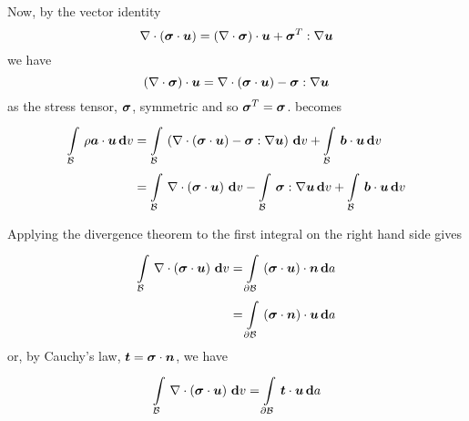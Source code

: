Now, by the vector identity
\begin{equation}
  \divergence{}{\pbrac{\dotprod{\tensortwo{\sigma}}{\vectr{u}}}}=\dotprod{\pbrac{\divergence{}{\tensortwo{\sigma}}}}{\vectr{u}}+
  \doubledotprod{\transpose{\tensortwo{\sigma}}}{\gradient{}{\vectr{u}}}
\end{equation}
we have
\begin{equation}
  \dotprod{\pbrac{\divergence{}{\tensortwo{\sigma}}}}{\vectr{u}}=\divergence{}{\pbrac{\dotprod{\tensortwo{\sigma}}{\vectr{u}}}}-
  \doubledotprod{\tensortwo{\sigma}}{\gradient{}{\vectr{u}}}
\end{equation}
as the stress tensor, $\boldsymbol{\mathit{\sigma}}$, symmetric and so
${\boldsymbol{\mathit{\sigma}}}^{T}=\boldsymbol{\mathit{\sigma}}$.  becomes
\begin{equation}
  \begin{split}
    \gint{\embedmanifold{B}}{}{\dotprod{\rho\vectr{a}}{\vectr{u}}}{v}&=
    \gint{\embedmanifold{B}}{}{\pbrac{\divergence{}{\pbrac{\dotprod{\tensor{\sigma}}{\vectr{u}}}}-
        \doubledotprod{\tensor{\sigma}}{\gradient{}{\vectr{u}}}}}{v}+
    \gint{\embedmanifold{B}}{}{\dotprod{\vectr{b}}{\vectr{u}}}{v} \\
    &=\gint{\embedmanifold{B}}{}{\divergence{}{\pbrac{\dotprod{\tensor{\sigma}}{\vectr{u}}}}}{v}-
    \gint{\embedmanifold{B}}{}{\doubledotprod{\tensor{\sigma}}{\gradient{}{\vectr{u}}}}{v}+
    \gint{\embedmanifold{B}}{}{\dotprod{\vectr{b}}{\vectr{u}}}{v}
  \end{split}
\end{equation}

Applying the divergence theorem to the first integral on the right hand side
gives
\begin{equation}
  \begin{split}
    \gint{\embedmanifold{B}}{}{\divergence{}{\pbrac{\dotprod{\tensor{\sigma}}{\vectr{u}}}}}{v}
    &=\gint{\boundary{\embedmanifold{B}}}{}{\dotprod{\pbrac{\dotprod{\tensor{\sigma}}{\vectr{u}}}}{\vectr{n}}}{a}\\
    &=\gint{\boundary{\embedmanifold{B}}}{}{\dotprod{\pbrac{\dotprod{\tensor{\sigma}}{\vectr{n}}}}{\vectr{u}}}{a}
  \end{split}
\end{equation}
or, by Cauchy's law, $\boldsymbol{t}=\boldsymbol{\mathit{\sigma}}\cdot\boldsymbol{n}$, we have
\begin{equation}
  \gint{\embedmanifold{B}}{}{\divergence{}{\pbrac{\dotprod{\tensor{\sigma}}{\vectr{u}}}}}{v}=
  \gint{\boundary{\embedmanifold{B}}}{}{\dotprod{\vectr{t}}{\vectr{u}}}{a}
\end{equation}

